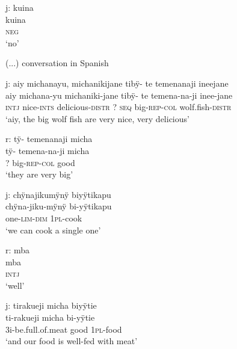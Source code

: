 \ea%
\begingl 
\glpreamble \textup{j:} kuina\\
\gla kuina\\ 
\glb \textsc{neg}\\ 
\glft ‘no’\\ 
\endgl
\xe

(...) conversation in Spanish


\ea%
\begingl 
\glpreamble \textup{j:} aiy michanayu, michanikijane tibÿ- te temenanaji ineejane\\
\gla aiy michana-yu michaniki-jane tibÿ- te temena-na-ji inee-jane\\ 
\glb \textsc{intj} nice-\textsc{ints} delicious-\textsc{distr} ? \textsc{seq} big-\textsc{rep}-\textsc{col} wolf.fish-\textsc{distr}\\ 
\glft ‘aiy, the big wolf fish are very nice, very delicious’\\ 
\endgl
\xe


\ea%
\begingl 
\glpreamble \textup{r:} tÿ- temenanaji micha\\
\gla tÿ- temena-na-ji micha\\ 
\glb ? big-\textsc{rep}-\textsc{col} good\\ 
\glft ‘they are very big’\\ 
\endgl
\xe

\ea%
\begingl 
\glpreamble \textup{j:} chÿnajikumÿnÿ biyÿtikapu\\
\gla chÿna-jiku-mÿnÿ bi-yÿtikapu\\ 
\glb one-\textsc{lim}-\textsc{dim} 1\textsc{pl}-cook\\ 
\glft ‘we can cook a single one’\\ 
\endgl
\xe

\ea%
\begingl 
\glpreamble \textup{r:} mba\\
\gla mba\\ 
\glb \textsc{intj}\\ 
\glft ‘well’\\ 
\endgl
\xe


\ea%
\begingl 
\glpreamble \textup{j:} tirakueji micha biyÿtie\\
\gla ti-rakueji micha bi-yÿtie\\ 
\glb 3i-be.full.of.meat good 1\textsc{pl}-food\\ 
\glft ‘and our food is well-fed with meat’\\ 
\endgl
\xe

